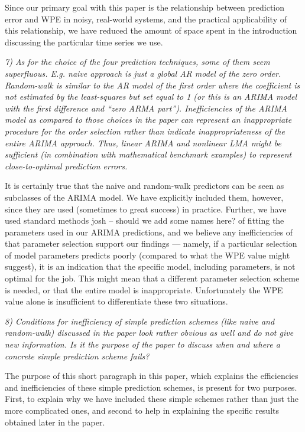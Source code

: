 \documentclass[12pt]{article}
\newcommand{\alert}[1]{{\color{red}#1}}
\begin{document}
Since our primary goal with this paper is the relationship between prediction
error and WPE in noisy, real-world systems, and the practical applicability of
this relationship, we have reduced the amount of space spent in the introduction
discussing the particular time series we use.

\emph{7) As for the choice of the four prediction techniques, some of them seem
superfluous. E.g. naive approach is just a global AR model of the zero order.
Random-walk is similar to the AR model of the first order where the coefficient
is not estimated by the least-squares but set equal to 1 (or this is an ARIMA
model with the first difference and ``zero ARMA part''). Inefficiencies of the
ARIMA model as compared to those choices in the paper can represent an
inappropriate procedure for the order selection rather than indicate
inappropriateness of the entire ARIMA approach. Thus, linear ARIMA and nonlinear
LMA might be sufficient (in combination with mathematical benchmark examples) to
represent close-to-optimal prediction errors.}

It is certainly true that the naive and random-walk predictors can be seen as
subclasses of the ARIMA model. We have explicitly included them, however, since
they are used (sometimes to great success) in practice. Further, we have used
standard methods \alert{josh -- should we add some names here?} of fitting the
parameters used in our ARIMA predictions, and we believe any inefficiencies of
that parameter selection support our findings --- namely, if a particular
selection of model parameters predicts poorly (compared to what the WPE value
might suggest), it is an indication that the specific model, including
parameters, is not optimal for the job. This might mean that a different
parameter selection scheme is needed, or that the entire model is inappropriate.
Unfortunately the WPE value alone is insufficient to differentiate these two
situations.

\emph{8) Conditions for inefficiency of simple prediction schemes (like naive
and random-walk) discussed in the paper look rather obvious as well and do not
give new information. Is it the purpose of the paper to discuss when and where a
concrete simple prediction scheme fails?}

The purpose of this short paragraph in this paper, which explains the
efficiencies and inefficiencies of these simple prediction schemes, is present
for two purposes. First, to explain why we have included these simple schemes
rather than just the more complicated ones, and second to help in explaining the
specific results obtained later in the paper.
\end{document}

